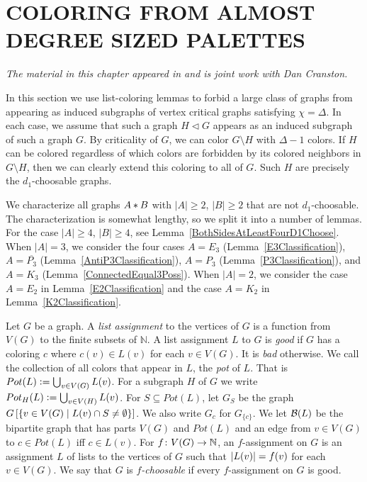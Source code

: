 \chapter{COLORING FROM ALMOST DEGREE SIZED PALETTES}
\label{ListColoringChapter}
\begin{center}
\emph{The material in this chapter appeared in \cite{mules} and is joint work with Dan Cranston.}
\end{center}

In this section we use list-coloring lemmas to forbid a large class of graphs
from appearing as induced subgraphs of vertex critical graphs satisfying $\chi = \Delta$.  In each case, we assume that such a graph
$H\lhd G$ appears as an induced subgraph of such a graph $G$.  By criticality of
$G$, we can color $G\setminus H$ with $\Delta-1$ colors.  If $H$ can be colored
regardless of which colors are forbidden by its colored neighbors in $G\setminus
H$, then we can clearly extend this coloring to all of $G$.  Such $H$ are precisely the $d_1$-choosable graphs.

We characterize all graphs $A \mbox{\hspace{2 pt}$\ast$\hspace{2 pt}} B$ with $|A|\ge 2$,
$|B|\ge 2$ that are not $d_1$-choosable.
The characterization is somewhat lengthy, so we split it into a number of
lemmas.  For the case $|A|\ge 4$, $|B|\ge 4$, see
Lemma~\ref{BothSidesAtLeastFourD1Choose}.  When $|A|= 3$, we consider the
four cases $A=E_3$ (Lemma~\ref{E3Classification}), $A=\overline{P_3}$
(Lemma~\ref{AntiP3Classification}), $A=P_3$ (Lemma~\ref{P3Classification}), and
$A=K_3$ (Lemma~\ref{ConnectedEqual3Poss}).
When $|A|=2$, we consider the case $A=E_2$ in
Lemma~\ref{E2Classification} and the case $A=K_2$ in Lemma~\ref{K2Classification}.

\smallskip

Let $G$ be a graph.  A \emph{list assignment} to the vertices of $G$ is a
function from $V(G)$ to the finite subsets of $\mathbb{N}$.  A list assignment
$L$ to $G$ is \emph{good} if $G$ has a coloring $c$ where $c(v) \in L(v)$ for
each $v \in V(G)$.  It is \emph{bad} otherwise.  We call the collection of all
colors that appear in $L$, the \emph{pot} of $L$.  That is $Pot(L) \mathrel{\mathop:}=
\bigcup_{v \in V(G)} L(v)$.  For a subgraph $H$ of $G$ we write $Pot_H(L)
\mathrel{\mathop:}= \bigcup_{v \in V(H)} L(v)$. For $S \subseteq Pot(L)$, let $G_S$ be
the graph $G\left[\left\{ v \in V(G) \mid L(v) \cap S \neq \emptyset \right\}\right]$.  We also
write $G_c$ for $G_{\{c\}}$. We let $\mathcal{B}(L)$ be the bipartite graph that
has parts $V(G)$ and $Pot(L)$ and an edge from $v \in V(G)$ to $c \in Pot(L)$
iff $c \in L(v)$. For $f\colon V(G) \rightarrow \mathbb{N}$, an $f$-assignment on $G$ is an
assignment $L$ of lists to the vertices of $G$ such that $\left|L(v)\right| = f(v)$
for each $v \in V(G)$.  We say that $G$ is \textit{$f$-choosable} if every
$f$-assignment on $G$ is good.

